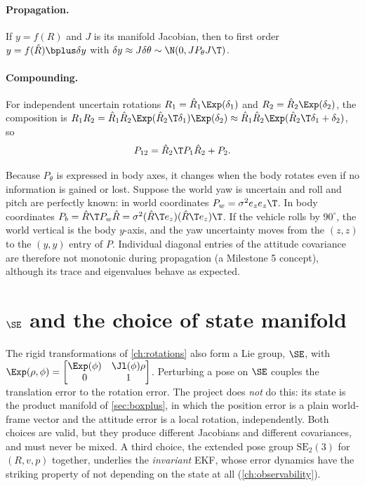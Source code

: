 \paragraph{Propagation.} If $y = f(R)$ and $J$ is its manifold Jacobian, then to first order
$y = f(\hat R)\bplus\delta y$ with $\delta y \approx J\delta\theta \sim \N(0, JP_\theta J\T)$.

\paragraph{Compounding.} For independent uncertain rotations $R_1 = \hat R_1\Exp(\delta_1)$ and
$R_2 = \hat R_2\Exp(\delta_2)$, the composition is
$R_1R_2 = \hat R_1\hat R_2\Exp(\hat R_2\T\delta_1)\Exp(\delta_2) \approx \hat R_1\hat R_2\Exp(\hat R_2\T\delta_1 + \delta_2)$, so
\begin{equation}
  P_{12} = \hat R_2\T P_1\hat R_2 + P_2 .
\end{equation}

\begin{remark}
\label{rem:cov-rotates}
Because $P_\theta$ is expressed in body axes, it changes when the body rotates even if no information is
gained or lost. Suppose the world yaw is uncertain and roll and pitch are perfectly known: in world
coordinates $P_w = \sigma^2 e_ze_z\T$. In body coordinates $P_b = \hat R\T P_w\hat R = \sigma^2 (\hat R\T e_z)(\hat R\T e_z)\T$.
If the vehicle rolls by $90^\circ$, the world vertical is the body $y$-axis, and the yaw uncertainty moves
from the $(z,z)$ to the $(y,y)$ entry of $P$. Individual diagonal entries of the attitude covariance
are therefore not monotonic during propagation (a Milestone 5 concept), although its trace and
eigenvalues behave as expected.
\end{remark}

\section{\texorpdfstring{$\SE$}{SE(3)} and the choice of state manifold}

The rigid transformations of \cref{ch:rotations} also form a Lie group, $\SE$, with
$\Exp(\rho, \phi) = \begin{bmatrix}\Exp(\phi) & \Jl(\phi)\rho \\ 0 & 1\end{bmatrix}$. Perturbing a pose on $\SE$
couples the translation error to the rotation error. The project does \emph{not} do this: its state is
the product manifold of \cref{sec:boxplus}, in which the position error is a plain world-frame vector
and the attitude error is a local rotation, independently. Both choices are valid, but they produce
different Jacobians and different covariances, and must never be mixed. A third choice, the extended
pose group $\mathrm{SE}_2(3)$ for $(R, v, p)$ together, underlies the \emph{invariant} EKF, whose
error dynamics have the striking property of not depending on the state at all (\cref{ch:observability}).

